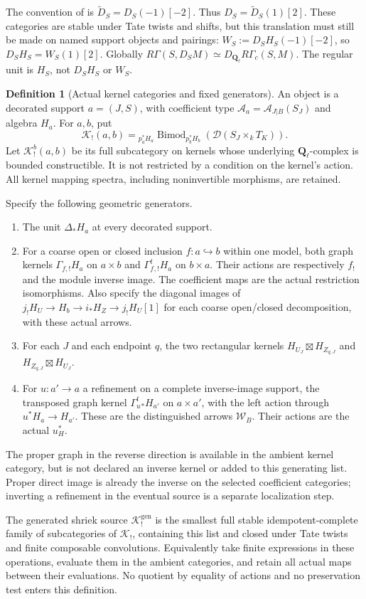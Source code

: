\documentclass[11pt]{article}
\theoremstyle{definition}
\newtheorem{definition}[proposition]{Definition}
\theoremstyle{remark}
\newcommand{\Q}{\mathbf Q_\ell}
\begin{document}
The convention of \cite{Refinement} is
$\widetilde D_S=D_S(-1)[-2]$.  Thus $D_S=\widetilde D_S(1)[2]$.
These categories are stable under Tate twists and shifts, but this
translation must still be made on named support objects and pairings:
$W_S:=D_SH_S(-1)[-2]$, so $D_SH_S=W_S(1)[2]$.  Globally
$R\Gamma(S,D_SM)\simeq D_{\Q}R\Gamma_c(S,M)$.
The regular unit is $H_S$, not $D_SH_S$ or $W_S$.

\begin{definition}[Actual kernel categories and fixed generators]
\label{def:kernel-source}
An object is a decorated support $a=(J,S)$, with coefficient type
$\mathcal A_a=\mathcal A_{J|B}(S_J)$ and algebra $H_a$.
For $a,b$, put
\[
 \mathscr K_!(a,b)=
 {}_{p_a^*H_a}\operatorname{Bimod}_{p_b^*H_b}
                         (\mathscr D(S_J\times_k T_K)).
\]
Let $\mathscr K_!^b(a,b)$ be its full subcategory on kernels whose
underlying $\Q$-complex is bounded constructible.  It is not restricted
by a condition on the kernel's action.  All kernel mapping spectra,
including noninvertible morphisms, are retained.

Specify the following geometric generators.
\begin{enumerate}
\item The unit $\Delta_*H_a$ at every decorated support.
\item For a coarse open or closed inclusion $f:a\hookrightarrow b$
within one model, both graph kernels
$\Gamma_{f,!}H_a$ on $a\times b$ and
$\Gamma_{f}^{t}{}_{,!}H_a$ on $b\times a$.
Their actions are respectively $f_!$ and the module inverse image.
The coefficient maps are the actual restriction isomorphisms.
Also specify the diagonal images of
$j_!H_{U}\to H_b\to i_*H_Z\to j_!H_U[1]$ for each coarse
open/closed decomposition, with these actual arrows.
\item For each $J$ and each endpoint $q$, the two rectangular kernels
$H_{U_J}\boxtimes H_{Z_{q,J}}$ and
$H_{Z_{q,J}}\boxtimes H_{U_J}$.
\item For $u:a'\to a$ a refinement on a complete inverse-image
support, the transposed graph kernel
$\Gamma_u^{t}{}_*H_{a'}$ on $a\times a'$, with the left action
through $u^*H_a\to H_{a'}$.  These are the distinguished arrows
$\mathcal W_B$.  Their actions are the actual $u_H^*$.
\end{enumerate}
The proper graph in the reverse direction is available in the
ambient kernel category, but is not declared an inverse kernel or
added to this generating list.  Proper direct image is already the
inverse on the selected coefficient categories; inverting a refinement
in the eventual source is a separate localization step.

The generated shriek source $\mathscr K_!^{\mathrm{gen}}$ is the smallest
full stable idempotent-complete family of subcategories of
$\mathscr K_!$, containing this list and closed under Tate twists and
finite composable convolutions.  Equivalently take finite expressions
in these operations, evaluate them in the ambient categories, and
retain all actual maps between their evaluations.  No quotient by
equality of actions and no preservation test enters this definition.
\end{definition}
\end{document}

